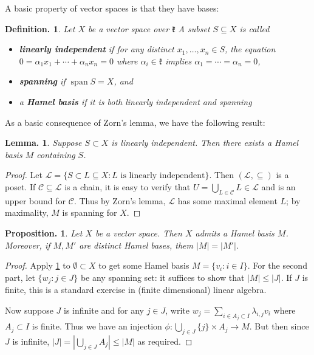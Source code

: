 \documentclass[11pt, a4paper]{memoir}
\theoremstyle{change}
\newtheorem{lemma}[theorem]{Lemma.}
\newtheorem{proposition}[theorem]{Proposition.}
\theoremstyle{plain}
\theoremstyle{nonumberplain}
\newtheorem{definition}{Definition.}
\newtheorem{proof}{Proof}
\DeclareMathOperator{\spn}{span}
\numberwithin{equation}{section}
\begin{document}
A basic property of vector spaces is that they have bases:
\begin{definition}
    Let $X$ be a vector space over $\mathfrak{k}$
    A subset $S\subseteq X$ is called
    \begin{itemize}[nl]
        \item \textbf{linearly independent} if for any distinct $x_1,\ldots,x_n\in S$, the equation $0=\alpha_1x_1+\cdots+\alpha_nx_n=0$ where $\alpha_i\in \mathfrak{k}$ implies $\alpha_1=\cdots=\alpha_n=0$,
        \item \textbf{spanning} if $\spn S=X$, and
        \item a \textbf{Hamel basis} if it is both linearly independent and spanning
    \end{itemize}
\end{definition}
As a basic consequence of Zorn's lemma, we have the following result:
\begin{lemma}\label{l:ind}
    Suppose $S\subset X$ is linearly independent.
    Then there exists a Hamel basis $M$ containing $S$.
\end{lemma}
\begin{proof}
    Let $\mathcal{L}=\{S\subset L\subseteq X:L\text{ is linearly independent}\}$.
    Then $(\mathcal{L},\subseteq)$ is a poset.
    If $\mathcal{C}\subseteq\mathcal{L}$ is a chain, it is easy to verify that $U=\bigcup_{L\in\mathcal{C}}L\in\mathcal{L}$ and is an upper bound for $\mathcal{C}$.
    Thus by Zorn's lemma, $\mathcal{L}$ has some maximal element $L$; by maximality, $M$ is spanning for $X$.
\end{proof}
\begin{proposition}
    Let $X$ be a vector space.
    Then $X$ admits a Hamel basis $M$.
    Moreover, if $M,M'$ are distinct Hamel bases, them $|M|=|M'|$.
\end{proposition}
\begin{proof}
    Apply \cref{l:ind} to $\emptyset\subset X$ to get some Hamel basis $M=\{v_i:i\in I\}$.
    For the second part, let $\{w_j:j\in J\}$ be any spanning set: it suffices to show that $|M|\leq|J|$.
    If $J$ is finite, this is a standard exercise in (finite dimensional) linear algebra.

    Now suppose $J$ is infinite and for any $j\in J$, write $w_j=\sum_{i\in A_j\subset I}\lambda_{i,j}v_i$ where $A_j\subset I$ is finite.
    Thus we have an injection $\phi:\bigcup_{j\in J}\{j\}\times A_j\to M$.
    But then since $J$ is infinite, $|J|=\left\lvert\bigcup_{j\in J}A_j\right\rvert\leq|M|$ as required.
\end{proof}
\end{document}
